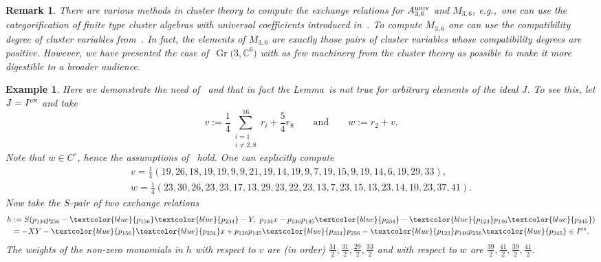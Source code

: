 \documentclass[pdftex]{sigma}%
\newtheorem{Example}[Theorem]{Example}
\newtheorem{Remark}[Theorem]{Remark}}
\numberwithin{equation}{section}
\DeclareMathOperator{\Gr}{Gr}
\begin{document}
\begin{Remark}
There are various methods in cluster theory to compute the exchange relations for $A_{3,6}^{\rm univ}$ and $M_{3,6} $, e.g.,~one can use the categorification of finite type cluster algebras with universal coefficients introduced in~\cite{NC_univ}.
To compute $M_{3,6} $ one can use the compatibility degree of cluster variables from~\cite{FZ_Y-systems}.
In fact, the elements of $M_{3,6}$ are exactly those pairs of cluster variables whose compatibility degrees are positive.
However, we have presented the case of~$\Gr\big(3,\mathbb C^6\big)$ with as few machinery from the cluster theory as possible to make it more digestible to a broader audience.
\end{Remark}
\begin{Example}
Here we demonstrate the need of~ and that in fact the Lemma~is not true for arbitrary elements of the ideal $J$. To see this, let $J=I^{\rm ex}$ and take
\begin{displaymath}
v:= \frac{1}{4}\sum_{\begin{smallmatrix}
i=1\\
i\not =2,8
\end{smallmatrix}}^{16} r_i + \frac{5}{4}r_8\qquad \text{and}\qquad w := r_2 + v.
\end{displaymath}
Note that $w\in C^\circ$, hence the assumptions of~ hold.
One can explicitly compute
\begin{gather*}
v = \frac{1}{4}(19, 26, 18, 19, 19, 9, 9, 21, 19, 14, 19, 9, 7, 19, 15, 9, 19, 14, 6, 19, 29, 33),
\\
w = \frac{1}{4}(23, 30, 26, 23, 23, 17, 13, 29, 23, 22, 23, 13, 7, 23, 15, 13, 23, 14, 10, 23, 37, 41).
\end{gather*}
Now take the $S$-pair of two exchange relations
\begin{displaymath}\begin{split}
h&:=S(p_{134}p_{256} - \textcolor{blue}{p_{156}}\textcolor{blue}{p_{234}} - {Y},\ p_{134}x - p_{136}p_{145}\textcolor{blue}{p_{234}} - \textcolor{blue}{p_{123}}p_{146}\textcolor{blue}{p_{345}}) \\
&= -{XY} - \textcolor{blue}{p_{156}}\textcolor{blue}{p_{234}}x + p_{136}p_{145}\textcolor{blue}{p_{234}}p_{256} - \textcolor{blue}{p_{123}}p_{146}p_{256}\textcolor{blue}{p_{345}} \in I^{\rm ex}.\end{split}
\end{displaymath}
The weights of the non-zero monomials in $h$ with respect to $v$ are (in order) $\frac{31}{2} , \frac{31}{2}, \frac{29}{2}, \frac{33}{2}$ and with respect to $w$ are $\frac{39}{2} , \frac{41}{2}, \frac{39}{2}, \frac{41}{2}$.

\end{Example}
\end{document}
